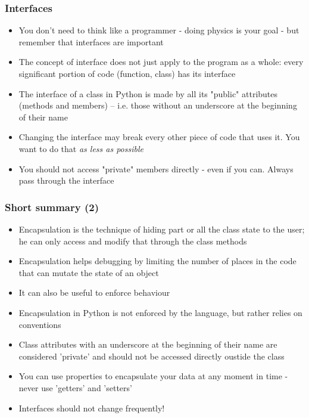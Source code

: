 \documentclass[9pt]{beamer}
\begin{document}
 
\begin{frame}
  \frametitle{Interfaces}
    
  \begin{itemize}
    \item You don't need to think like a programmer - doing physics is your goal - but
          remember that \alert{interfaces are important}
    \medskip
    \item The concept of interface does not just apply to the program as a whole:
          every significant portion of code (function, class) has its interface
    \medskip
    \item The interface of a class in Python is made by all its "public" attributes (methods and members)
          -- i.e. those without an underscore at the beginning of their name
    \medskip
    \item Changing the interface may break every other piece of code that uses it.
          You want to do that \emph{as less as possible}
    \medskip
    \item You should not access "private" members directly - even if you can. Always
          pass through the interface
    
  \end{itemize}

\end{frame}


\begin{frame}
  \frametitle{Short summary (2)}
    
  \begin{itemize}
    \small
    \item Encapsulation is the technique of hiding part or all the class state to the user; 
          he can only access and modify that through the class methods
    \medskip
    \item Encapsulation helps debugging by limiting the number of places in the code
          that can mutate the state of an object
    \medskip
    \item It can also be useful to enforce behaviour  
    \medskip
    \item Encapsulation in Python is not enforced by the language, but rather relies on conventions
    \medskip
    \item Class attributes with an underscore at the beginning of their name are
          considered 'private' and should not be accessed directly oustide the class
    \smallskip
    \item You can use properties to encapsulate your data at any moment in time - never use 'getters' and 'setters'
    \medskip
    \item Interfaces should not change frequently!
  \end{itemize}
  
\end{frame}
\end{document}
